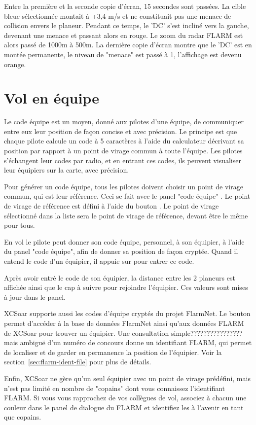 Entre la première et la seconde copie d'écran, 15 secondes sont passées. La cible bleue sélectionnée montait à +3,4 m/s et ne constituait pas une menace de collision envers le planeur. Pendant ce temps, le 'DC' s'est incliné vers la gauche, devenant une menace et passant alors en rouge. Le zoom du radar FLARM est alors passé de 1000m à 500m. La dernière copie d'écran montre que le 'DC' est en montée permanente, le niveau de "menace" est passé à 1, l'affichage est devenu orange.

\section{Vol en équipe}\label{sec:team-flying}

Le code équipe est un moyen, donné aux pilotes d'une équipe, de communiquer entre eux leur position de façon concise et avec précision. Le principe est que chaque pilote calcule un code à 5 caractères à l'aide du calculateur décrivant sa position par rapport à un point de virage commun à toute l'équipe. Les pilotes s'échangent leur codes par radio, et en entrant ces codes, ils peuvent visualiser leur équipiers sur la carte, avec précision.

Pour générer un code équipe, tous les pilotes doivent choisir un point de virage commun, qui est leur référence. Ceci se fait avec le panel "code équipe" \blink{}. Le point de virage de référence est défini à l'aide du bouton . Le point de virage sélectionné dans la liste sera le point de virage de référence, devant être le même pour tous.

En vol le pilote peut donner son code équipe, personnel, à son équipier, à l'aide du panel "code équipe", afin de donner sa position de façon cryptée. Quand il entend le code d'un équipier, il appuie sur  pour entrer ce code.


Après avoir entré le code de son équipier, la distance entre les 2 planeurs est affichée ainsi que le cap à suivre pour rejoindre l'équipier. Ces valeurs sont mises à jour dans le panel.

XCSoar supporte aussi les codes d'équipe cryptés du projet FlarmNet. Le bouton  permet d'accéder à la base de données FlarmNet ainsi qu'aux données FLARM de XCSoar pour trouver un équipier. Une consultation simple???????????????? mais ambiguë d'un numéro de concours donne un identifiant FLARM, qui permet de localiser et de garder en permanence la position de l'équipier. Voir la section~\ref{sec:flarm-ident-file} pour plus de détails.

Enfin, XCSoar ne gère qu'un seul équipier avec un point de virage prédéfini, mais n'est pas limité en nombre de "copains" dont vous connaissez l'identifiant FLARM. Si vous vous rapprochez de vos collègues de vol, associez à chacun une couleur dans le panel de dialogue du FLARM et identifiez les à l'avenir en tant que copains.



